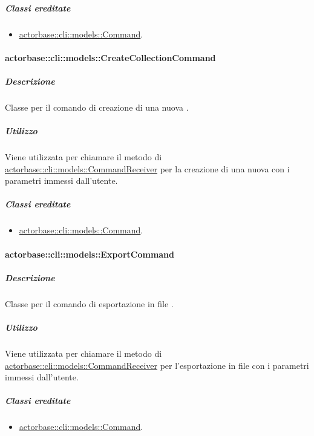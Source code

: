 \documentclass{scalatekids-article}
\begin{document}
\subparagraph{Classi ereditate}

\begin{itemize}
\item \hyperref[sec:actorbase::cli::models::Command]{actorbase::cli::models::Command}.
\end{itemize}

\paragraph{actorbase::cli::models::CreateCollectionCommand}
\label{sec:actorbase::cli::models::CreateCollectionCommand}

\subparagraph{Descrizione}

Classe per il comando di creazione di una nuova .

\subparagraph{Utilizzo}

Viene utilizzata per chiamare il metodo di
\hyperref[sec:actorbase::cli::models::CommandReceiver]{actorbase::cli::models::CommandReceiver} per la creazione di una nuova
 con i parametri immessi dall'utente.

\subparagraph{Classi ereditate}

\begin{itemize}
\item \hyperref[sec:actorbase::cli::models::Command]{actorbase::cli::models::Command}.
\end{itemize}

\paragraph{actorbase::cli::models::ExportCommand}
\label{sec:actorbase::cli::models::ExportCommand}

\subparagraph{Descrizione}

Classe per il comando di esportazione in file .

\subparagraph{Utilizzo}

Viene utilizzata per chiamare il metodo di
\hyperref[sec:actorbase::cli::models::CommandReceiver]{actorbase::cli::models::CommandReceiver} per l'esportazione in file
 con i parametri immessi dall'utente.

\subparagraph{Classi ereditate}

\begin{itemize}
\item \hyperref[sec:actorbase::cli::models::Command]{actorbase::cli::models::Command}.
\end{itemize}
\end{document}
